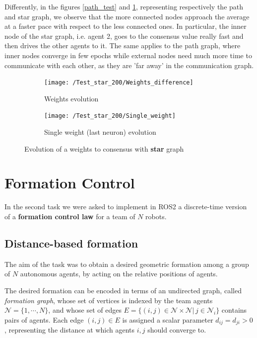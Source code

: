 \documentclass[a4paper,11pt,oneside]{book}
\begin{document}
Differently, in the figures \ref{path_test} and \ref{star_test}, representing respectively the path and star graph, we observe that the more connected nodes approach the average at a faster pace with respect to the less connected ones. In particular, the inner node of the star graph, i.e. agent 2, goes to the consensus value really fast and then drives the other agents to it. The same applies to the path graph, where inner nodes converge in few epochs while external nodes need much more time to communicate with each other, as they are 'far away' in the communication graph.


\begin{figure}[h]
\centering
	\begin{subfigure}{0.49\textwidth}	
	\texttt{[image: /Test\_star\_200/Weights\_difference]}
	\caption{Weights evolution}
	\end{subfigure}
\hfill
	\begin{subfigure}{0.49\textwidth}	
	\texttt{[image: /Test\_star\_200/Single\_weight]}
	\caption{Single weight (last neuron) evolution}
	\end{subfigure}
\caption{Evolution of a weights to consensus with \textbf{star} graph}
\label{star_test}
\end{figure}




\chapter{Formation Control} 
 In the second task we were asked to implement in ROS2 a discrete-time version of a \textbf{formation control law} for a team of $N$ robots.

\section{Distance-based formation}
The aim of the task was to obtain a desired geometric formation among a group of $N$ autonomous agents, by acting on the relative positions of agents.

\bigskip
The desired formation can be encoded in terms of an undirected graph, called \textit{formation graph}, whose set of vertices is indexed by the team agents $\mathcal{N} =\{ 1, \cdots, N\}$, and whose set of edges $E=\{(i,j) \in \mathcal{N} \times \mathcal{N} | \, j \in \mathcal{N}_i\}$ contains pairs of agents. Each edge $(i,j) \in E$ is assigned a scalar parameter $d_{ij} = d_{ji} > 0$, representing the distance at which agents $i,j$ should converge to. 
\end{document}
